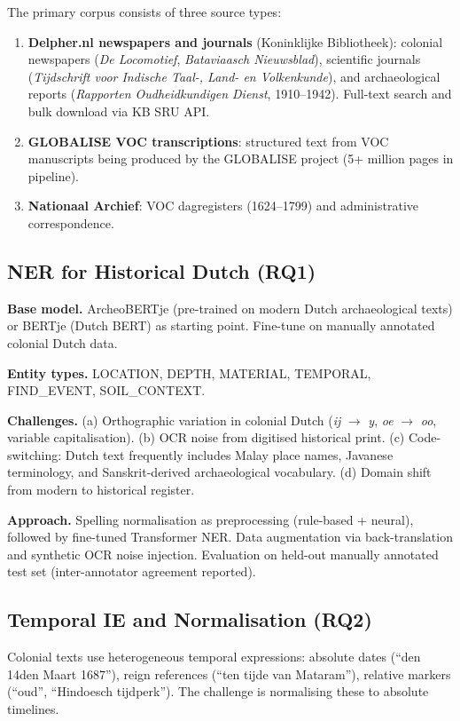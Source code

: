 \documentclass[11pt,a4paper]{article}
\begin{document}
The primary corpus consists of three source types:
\begin{enumerate}[nosep]
  \item \textbf{Delpher.nl newspapers and journals} (Koninklijke Bibliotheek): colonial newspapers (\emph{De Locomotief}, \emph{Bataviaasch Nieuwsblad}), scientific journals (\emph{Tijdschrift voor Indische Taal-, Land- en Volkenkunde}), and archaeological reports (\emph{Rapporten Oudheidkundigen Dienst}, 1910--1942). Full-text search and bulk download via KB SRU API.
  \item \textbf{GLOBALISE VOC transcriptions}: structured text from VOC manuscripts being produced by the GLOBALISE project (5+ million pages in pipeline).
  \item \textbf{Nationaal Archief}: VOC dagregisters (1624--1799) and administrative correspondence.
\end{enumerate}

\subsection{NER for Historical Dutch (RQ1)}

\textbf{Base model.} ArcheoBERTje (pre-trained on modern Dutch archaeological texts) or BERTje (Dutch BERT) as starting point. Fine-tune on manually annotated colonial Dutch data.

\textbf{Entity types.} LOCATION, DEPTH, MATERIAL, TEMPORAL, FIND\_EVENT, SOIL\_CONTEXT.

\textbf{Challenges.} (a) Orthographic variation in colonial Dutch (\emph{ij} $\rightarrow$ \emph{y}, \emph{oe} $\rightarrow$ \emph{oo}, variable capitalisation). (b) OCR noise from digitised historical print. (c) Code-switching: Dutch text frequently includes Malay place names, Javanese terminology, and Sanskrit-derived archaeological vocabulary. (d) Domain shift from modern to historical register.

\textbf{Approach.} Spelling normalisation as preprocessing (rule-based + neural), followed by fine-tuned Transformer NER. Data augmentation via back-translation and synthetic OCR noise injection. Evaluation on held-out manually annotated test set (inter-annotator agreement reported).

\subsection{Temporal IE and Normalisation (RQ2)}

Colonial texts use heterogeneous temporal expressions: absolute dates (``den 14den Maart 1687''), reign references (``ten tijde van Mataram''), relative markers (``oud'', ``Hindoesch tijdperk''). The challenge is normalising these to absolute timelines.
\end{document}
